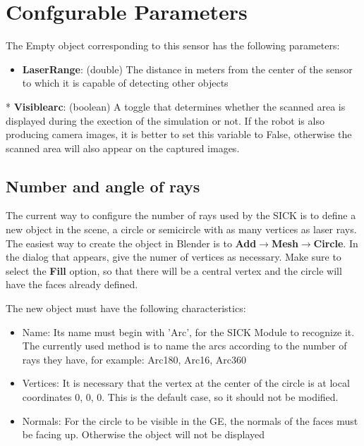 \documentclass[twoside,a4paper,10pt]{report}
\newcommand{\dokutitleleveltwo}[1]{\section{#1}}
\newcommand{\dokutitleleveltree}[1]{\subsection{#1}}
\newcommand{\dokubold}[1]{\textbf{#1}}
\newcommand{\dokuitem}{\item}
\begin{document}
\dokutitleleveltwo{Confgurable Parameters}
\label{4ac95ef244cd3311c21d0b799b57578c}%

The Empty object corresponding to this sensor has the following parameters:


\begin{itemize}
\dokuitem  \dokubold{Laser{\textunderscore}Range}: (double) The distance in meters from the center of the sensor to which it is capable of detecting other objects
\end{itemize}

  * \dokubold{Visible{\textunderscore}arc}: (boolean) A toggle that determines whether the scanned area is displayed during the exection of the simulation or not. If the robot is also producing camera images, it is better to set this variable to False, otherwise the scanned area will also appear on the captured images.


\dokutitleleveltree{Number and angle of rays}
\label{0e26d09474e479fcb039d350438a39b6}%

The current way to configure the number of rays used by the SICK is to define a new object in the scene, a circle or semicircle with as many vertices as laser rays.
The easiest way to create the object in Blender is to \dokubold{Add{$\rightarrow$}Mesh{$\rightarrow$}Circle}. In the dialog that appears, give the numer of vertices as necessary. Make sure to select the \dokubold{Fill} option, so that there will be a central vertex and the circle will have the faces already defined.

The new object must have the following characteristics:



\begin{itemize}
\dokuitem  Name: Its name must begin with 'Arc{\textunderscore}', for the SICK Module to recognize it. The currently used method is to name the arcs according to the number of rays they have, for example: Arc{\textunderscore}180, Arc{\textunderscore}16, Arc{\textunderscore}360
\end{itemize}

\begin{itemize}
\dokuitem  Vertices: It is necessary that the vertex at the center of the circle is at local coordinates 0, 0, 0. This is the default case, so it should not be modified.
\end{itemize}

\begin{itemize}
\dokuitem  Normals: For the circle to be visible in the GE, the normals of the faces must be facing up. Otherwise the object will not be displayed
\end{itemize}
\end{document}

